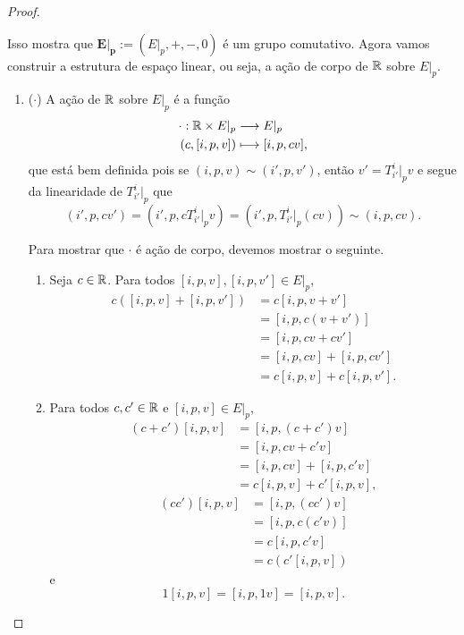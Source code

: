 \begin{proof}
\begin{enumerate}
Isso mostra que $\bm{E|_p} := (E|_p,+,-,0)$ é um grupo comutativo. Agora vamos construir a estrutura de espaço linear, ou seja, a ação de corpo de $\mathbb{R}$ sobre $E|_p$.

\begin{enumerate}
\item ($\cdot$) A ação de $\mathbb{R}$ sobre $E|_p$ é a função
	\begin{align*}
	{\cdot}: {\mathbb{R} \times E|_p} &\longrightarrow {E|_p} \\{(c,[i,p,v])} &\longmapsto {[i,p,cv]},
	\end{align*}
que está bem definida pois se $(i,p,v) \sim (i',p,v')$, então $v' = T^i_{i'}|_p v$ e segue da linearidade de $T^i_{i'}|_p$ que
	\begin{equation*}
	(i',p,cv') = (i',p,cT^i_{i'}|_p v) = (i',p,T^i_{i'}|_p (cv)) \sim (i,p,cv).
	\end{equation*}

Para mostrar que $\cdot$ é ação de corpo, devemos mostrar o seguinte.
	\begin{enumerate}
	\item Seja $c \in \mathbb{R}$. Para todos $[i,p,v], [i,p,v'] \in E|_p$,
		\begin{align*}
		c([i,p,v] + [i,p,v']) &= c[i,p,v+ v'] \\
			&= [i,p,c(v+v')] \\
			&= [i,p,cv+cv'] \\
			&= [i,p,cv] + [i,p,cv'] \\
			&= c[i,p,v] + c[i,p,v'].
		\end{align*}
	
	\item Para todos $c,c' \in \mathbb{R}$ e $[i,p,v] \in E|_p$,
		\begin{align*}
		(c+c')[i,p,v] &= [i,p,(c+c')v] \\
			&= [i,p,cv + c'v] \\
			&= [i,p,cv] + [i,p,c'v] \\
			&= c[i,p,v] + c'[i,p,v],
		\end{align*}
		\begin{align*}
		(cc')[i,p,v] &= [i,p,(cc')v] \\
			&= [i,p,c(c'v)] \\
			&= c[i,p,c'v] \\
			&= c(c'[i,p,v])
		\end{align*}	
e
		\begin{equation*}
		1[i,p,v] = [i,p,1v] = [i,p,v].
		\end{equation*}
	\end{enumerate}
\end{enumerate}


\end{enumerate}
\end{proof}

